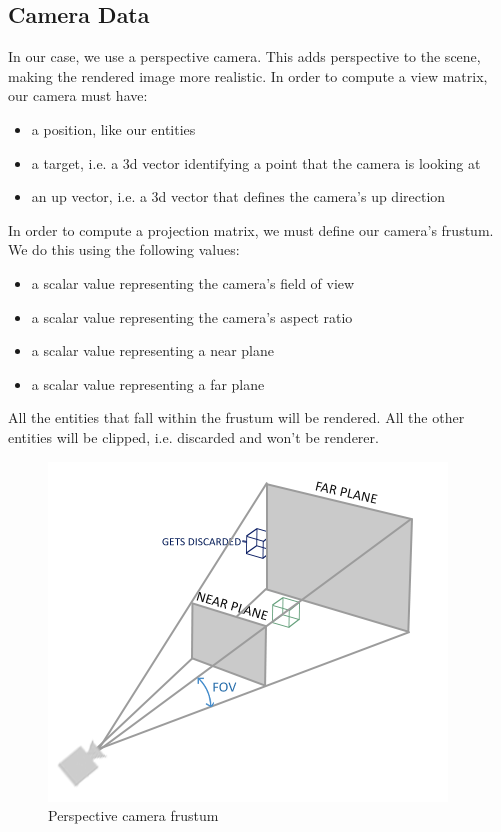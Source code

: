 \subsection{Camera Data}

In our case, we use a perspective camera.
This adds perspective to the scene, making the rendered image more realistic.
In order to compute a view matrix, our camera must have:
\begin{itemize}
    \item a position, like our entities
    \item a target, i.e. a 3d vector identifying a point that the camera is looking at
    \item an up vector, i.e. a 3d vector that defines the camera's up direction
\end{itemize}
In order to compute a projection matrix, we must define our camera's frustum.
We do this using the following values:
\begin{itemize}
    \item a scalar value representing the camera's field of view
    \item a scalar value representing the camera's aspect ratio
    \item a scalar value representing a near plane
    \item a scalar value representing a far plane
\end{itemize}
All the entities that fall within the frustum will be rendered.
All the other entities will be clipped, i.e. discarded and won't be renderer.

\begin{figure}[ht]
    \centering
    \includegraphics[scale=0.40]{images/ChScene/PerspectiveFrustum.png}
    \caption{Perspective camera frustum}
    \label{fig::PerspectiveFrustum}
\end{figure}

